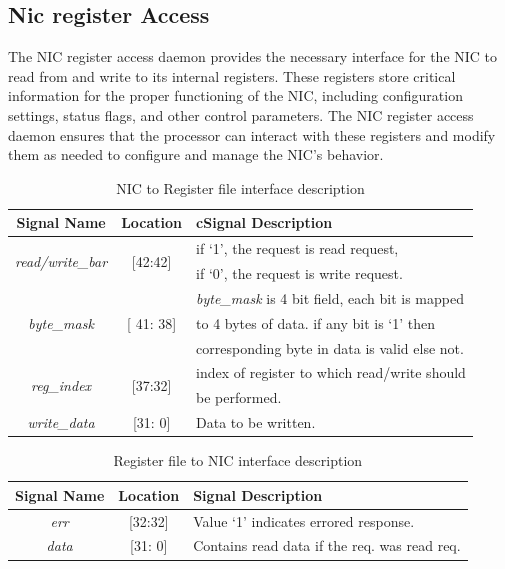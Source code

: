 \documentclass[12pt]{report}
\begin{document}
\begin{appendices}
		\subsection{Nic register Access}
				The NIC register access daemon provides the necessary interface for the NIC to read from and write to its internal registers. These registers store critical information for the proper functioning of the NIC, including configuration settings, status flags, and other control parameters. The NIC register access daemon ensures that the processor can interact with these registers and modify them as needed to configure and manage the NIC's behavior.
		\begin{table}[!htbp]
					\centering
					\begin{tabular}{ccl}
						\hline
						\textbf{Signal Name} 			& \textbf{Location} 		&{c}\textbf{Signal Description}  \\ \hline
						\multirow{2}{*}{\textit{read/write\_bar}}& \multirow{2}{*}{[42:42]}	& if `1', the request is read request,\\ 
											& 				& if `0', the request is write request.\\ \hline
						\multirow{3}{*}{\textit{byte\_mask}}	& \multirow{3}{*}{[ 41: 38]}	& \textit{byte\_mask} is 4 bit field, each bit is mapped\\
											&				& to 4 bytes of data. if any bit is `1' then\\
											& 				& corresponding byte in data is valid else not.\\ \hline 
						\multirow{2}{*}{\textit{reg\_index}}   	& \multirow{2}{*}{[37:32]} 	& index of register to which read/write should\\ 
											&				& be performed.\\ \hline
						\textit{write\_data}   			& [31: 0] 			& Data to be written.\\ \hline
					\end{tabular}
					\caption{NIC to Register file interface description}
					\label{tab:NIC-Reg-interface-req}
				\end{table}

				\begin{table}[!htbp]
					\centering
					\begin{tabular}{ccl}
						\hline
						\textbf{Signal Name} 		& \textbf{Location} 		&\textbf{Signal Description}  \\ \hline
						\textit{err}			& [32:32]			& Value `1' indicates errored response.\\\hline
						\textit{data}   		& [31: 0] 			& Contains read data if the req. was read req.\\ \hline
					\end{tabular}
					\caption{ Register file to NIC interface description}
					\label{tab:Reg-NIC-interface-resp}
				\end{table}



\end{appendices}
\end{document}
